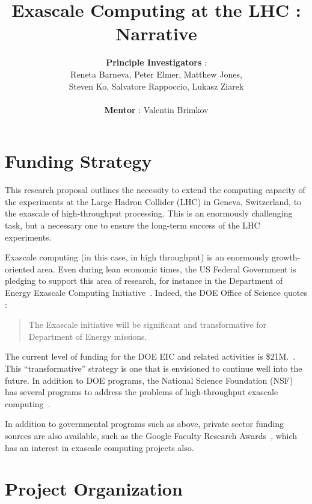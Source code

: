 \documentclass[12pt]{article}
\begin{document}
\title{Exascale Computing at the LHC : Narrative}
\author{{\bf Principle Investigators} : \\  Reneta Barneva, Peter
  Elmer, Matthew Jones, \\ Steven Ko, Salvatore Rappoccio, Lukasz Ziarek \\ \\ {\bf Mentor} : Valentin Brimkov}

\maketitle

\clearpage

\section{Funding Strategy}

This research proposal outlines the necessity to extend the computing
capacity of the experiments at the Large Hadron Collider (LHC) in
Geneva, Switzerland, to the exascale of high-throughput
processing. This is an enormously challenging task, but a necessary
one to ensure the long-term success of the LHC experiments. 

Exascale computing (in this case, in high throughput)
is an enormously growth-oriented area. Even during
lean economic times, the US Federal Government is pledging to support
this area of research, for instance in the Department of Energy
Exascale Computing Initiative~\cite{doe_eci}. Indeed, the DOE Office of
Science quotes :
\begin{quote}
The Exascale initiative will be significant and transformative for Department of Energy missions.
\end{quote}
The current level of funding for the DOE EIC and related activities is
\$21M.~\cite{doe_eci_budget}. This ``transformative'' strategy is one
that is envisioned to continue well into the future. 
In addition to DOE programs, the
National Science Foundation (NSF) has several programs to address the
problems of high-throughput exascale computing~\cite{nsf1,nsf2}.

In addition to governmental programs such as above, private sector
funding sources are also available, such as the Google Faculty
Research Awards~\cite{google_fac_awards}, which has an interest in
exascale computing projects also. 


\clearpage

\section{Project Organization}
\end{document}
